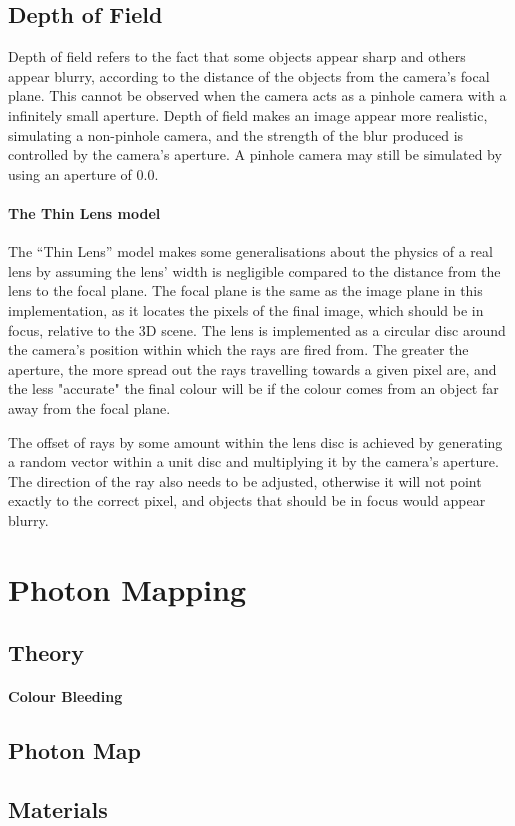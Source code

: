 \documentclass[a4paper]{article}
\begin{document}
\subsection{Depth of Field}\label{ss:depthoffield}
Depth of field refers to the fact that some objects appear sharp and others appear blurry, according to the distance of the objects from the camera's focal plane. This cannot be observed when the camera acts as a pinhole camera with a infinitely small aperture. Depth of field makes an image appear more realistic, simulating a non-pinhole camera, and the strength of the blur produced is controlled by the camera's aperture. A pinhole camera may still be simulated by using an aperture of $0.0$.

\paragraph{The Thin Lens model}
The ``Thin Lens'' model makes some generalisations about the physics of a real lens by assuming the lens' width is negligible compared to the distance from the lens to the focal plane. The focal plane is the same as the image plane in this implementation, as it locates the pixels of the final image, which should be in focus, relative to the 3D scene. The lens is implemented as a circular disc around the camera's position within which the rays are fired from. The greater the aperture, the more spread out the rays travelling towards a given pixel are, and the less "accurate" the final colour will be if the colour comes from an object far away from the focal plane.

The offset of rays by some amount within the lens disc is achieved by generating a random vector within a unit disc and multiplying it by the camera's aperture. The direction of the ray also needs to be adjusted, otherwise it will not point exactly to the correct pixel, and objects that should be in focus would appear blurry.

\section{Photon Mapping}
\subsection{Theory}

\paragraph{Colour Bleeding}

\subsection{Photon Map}

\subsection{Materials}
\end{document}
